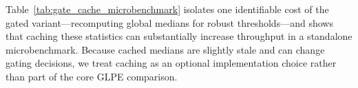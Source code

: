 Table~\ref{tab:gate_cache_microbenchmark} isolates one identifiable cost of the gated variant---recomputing global medians for robust thresholds---and shows that caching these statistics can substantially increase throughput in a standalone microbenchmark.
Because cached medians are slightly stale and can change gating decisions, we treat caching as an optional implementation choice rather than part of the core GLPE comparison.


